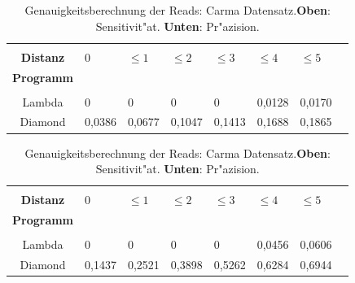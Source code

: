 \documentclass[10pt, a4paper]{article}[08.12.2015]
\begin{document}
     \begin{table}[H]
        \begin{tabular}{clllllll}
        &&&&&&\\
          \textbf{Distanz}&0&$\leq1$&$\leq2$&$\leq3$&$\leq4$&$\leq5$\\
          \textbf{Programm}&&&&&\\ \hline  
          &&&&&&\\
          Lambda&0&0&0&0&0,0128&0,0170\\
          Diamond&0,0386&0,0677&0,1047&0,1413&0,1688&0,1865\\
        \end{tabular}

        \begin{tabular}{clllllll}
          &&&&&&\\
          \textbf{Distanz}&0&$\leq1$&$\leq2$&$\leq3$&$\leq4$&$\leq5$\\
          \textbf{Programm}&&&&&\\ \hline  
          &&&&&&\\
          Lambda&0&0&0&0&0,0456&0,0606\\
          Diamond&0,1437&0,2521&0,3898&0,5262&0,6284&0,6944\\
        \end{tabular}
        \newline
        \caption[Genauigkeitsberechnung der Reads: Carma Datensatz.] {\small{Genauigkeitsberechnung der Reads: Carma Datensatz.\newline \textbf{Oben}: Sensitivit"at. \textbf{Unten}: Pr"azision.}} 
        
      \end{table}
\end{document}
